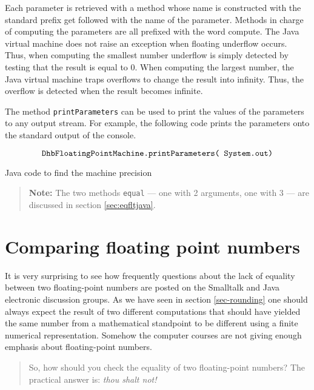 \documentclass[twoside]{book}
\begin{document}
Each parameter is retrieved with a method whose name is
constructed with the standard prefix get followed with the name of
the parameter. Methods in charge of computing the parameters are
all prefixed with the word compute. The Java virtual machine does
not raise an exception when floating underflow occurs. Thus, when
computing the smallest number underflow is simply detected by
testing that the result is equal to 0. When computing the largest
number, the Java virtual machine traps overflows to change the
result into infinity. Thus, the overflow is detected when the
result becomes infinite.

The method {\tt printParameters} can be used to print the values
of the parameters to any output stream. For example, the following
code prints the parameters onto the standard output of the
console.

$$\hbox{\tt DhbFloatingPointMachine.printParameters(
System.out)}$$

\begin{listing}
Java code to find the machine precision
\label{lj:floatmachine}

\end{listing}

\begin{quote}
{\bf Note:} The two methods {\tt equal} --- one with 2 arguments,
one with 3
--- are discussed in section \ref{sec:eqfltjava}.
\end{quote}

\section{Comparing floating point numbers}
It is very surprising to see how frequently questions about the
lack of equality between two floating-point numbers are posted on
the Smalltalk and Java electronic discussion groups. As we have
seen in section \ref{sec-rounding} one should always expect the
result of two different computations that should have yielded the
same number from a mathematical standpoint to be different using a
finite  numerical representation. Somehow the computer courses are
not giving enough emphasis about floating-point numbers.

\begin{quote}
So, how should you check the equality of two floating-point
numbers? \linebreak\noindent\hfil The practical answer is: {\sl
thou shalt not!}
\end{quote}
\end{document}
